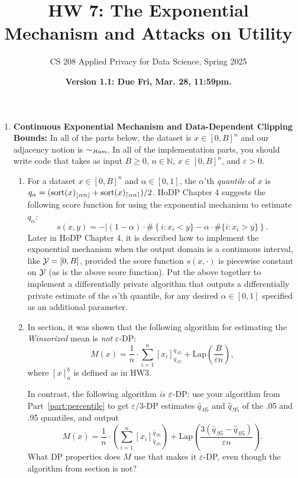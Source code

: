 \documentclass[11pt]{article}
\title{\vspace{-1.5cm} HW 7: The Exponential Mechanism and Attacks on Utility}
\author{CS 208 Applied Privacy for Data Science, Spring 2025}
\date{\textbf{Version 1.1: Due Fri, Mar. 28, 11:59pm.}}
\begin{document}
\maketitle

\instructions

\begin{enumerate}[leftmargin=*] 

        \item \textbf{Continuous Exponential Mechanism and Data-Dependent Clipping Bounds:} 
        In all of the parts below, the dataset is $x\in [0,B]^n$ and our adjacency notion is $\sim_{\textit{Ham}}$.   In all of the implementation parts, you should write
code that takes as input $B\geq 0$, $n\in\mathbb{N}$, $x\in [0,B]^n$, and $\varepsilon>0$.

        \begin{enumerate}
            \item \label{part:percentile} For a dataset $x\in [0,B]^n$ and $\alpha\in [0,1]$, the $\alpha$'th {\em quantile} of $x$ is $q_\alpha = (\mathrm{sort}(x)_{\lfloor \alpha n\rfloor} + \mathrm{sort}(x)_{\lceil \alpha n\rceil})/2$.
            HoDP Chapter 4 suggests the following score function for using the exponential mechanism to estimate $q_\alpha$:
            $$s(x,y) = -|(1-\alpha)\cdot \#\left\{ i : x_i < y\} - \alpha \cdot \#\{ i : x_i > y\}\right\}.$$
            Later in HoDP Chapter 4, it is described how to implement the exponential mechanism when the output domain is a continuous interval, like $\mathcal{Y} = [0,B]$, provided the score function $s(x,\cdot)$ is piecewise constant on $\mathcal{Y}$ (as is the above score function). 
            Put the above together to implement a differentially private algorithm that outputs a differentially private estimate of the $\alpha$'th quantile, for any desired $\alpha\in [0,1]$ specified as an additional parameter.

            \item \label{part:ExpWinsorized} 
            In section, it was shown that the following algorithm for estimating the {\em Winsorized} mean is {\em not} $\varepsilon$-DP:
$$M(x) = \frac{1}{n}\cdot \sum_{i=1}^n \left[x_i\right]_{q_{.05}}^{q_{.95}} +\mathrm{Lap}\left(\frac{B}{\varepsilon n}\right),$$
where $[x]_a^b$ is defined as in HW3.

In contrast, the following algorithm {\em is} $\varepsilon$-DP:
use your algorithm from Part~\ref{part:percentile} to get  $\varepsilon/3$-DP estimates
$\hat{q}_{.05}$ and $\hat{q}_{.95}$ of the .05 and .95 quantiles,
and output
$$M(x) = \frac{1}{n}\cdot \left(\sum_{i=1}^n \left[x_i\right]_{\hat{q}_{.05}}^{\hat{q}_{.95}}\right)
+ \mathrm{Lap}\left(\frac{3(\hat{q}_{.95}-\hat{q}_{.05})}{\varepsilon n}\right).$$
What DP properties does $M$ use that makes it $\varepsilon$-DP, even though the algorithm from section is not?


\end{enumerate}
\end{enumerate}
\end{document}
